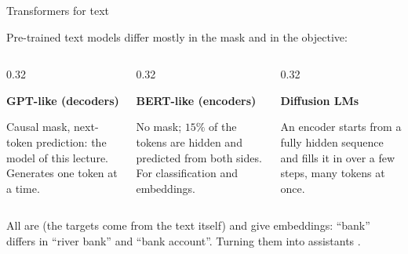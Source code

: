 \begin{frame}{Transformers for text}
    \setlength{\parskip}{6pt}

    Pre-trained text models differ mostly in the mask and in the objective:

    \begin{columns}[T,onlytextwidth]
        \begin{column}{0.32\textwidth}
            \begin{tcolorbox}[nndsblue,courseheight={tf-text}{0.3\textheight}]\small
                \textbf{\color{darkcerulean}GPT-like (decoders)}\par
                \RaggedRight
                Causal mask, next-token prediction: the model of this lecture.
                Generates one token at a time.
            \end{tcolorbox}
        \end{column}
        \begin{column}{0.32\textwidth}
            \begin{tcolorbox}[nndsgreen,courseheight={tf-text}{0.3\textheight}]\small
                \textbf{\color{darkgreen}BERT-like (encoders)}\par
                \RaggedRight
                No mask; $15\%$ of the tokens are hidden and predicted from
                both sides. For classification and embeddings.
            \end{tcolorbox}
        \end{column}
        \begin{column}{0.32\textwidth}
            \begin{tcolorbox}[nndsorange,courseheight={tf-text}{0.3\textheight}]\small
                \textbf{\color{draworange!70!black}Diffusion LMs}\par
                \RaggedRight
                An encoder starts from a fully hidden sequence and fills it in
                over a few steps, many tokens at once.
            \end{tcolorbox}
        \end{column}
    \end{columns}

    \medskip
    All are  (the targets come from the text itself)
    and give  embeddings: ``bank'' differs in ``river
    bank'' and ``bank account''. Turning them into assistants
    .


\end{frame}

